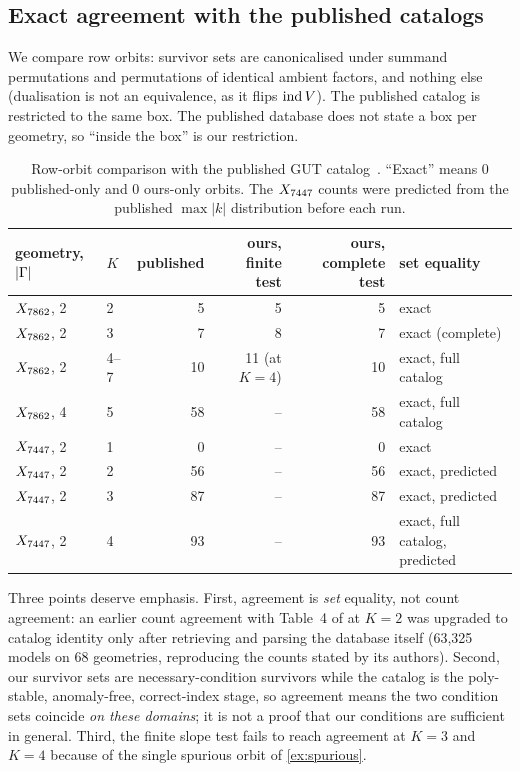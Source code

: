 \subsection{Exact agreement with the published catalogs}

We compare row orbits: survivor sets are canonicalised under summand
permutations and permutations of identical ambient factors, and nothing else
(dualisation is not an equivalence, as it flips $\operatorname{ind} V$). The published catalog
is restricted to the same box. The published database does not state a box per
geometry, so ``inside the box'' is our restriction.

\begin{table}[h]
\centering\footnotesize
\setlength{\tabcolsep}{4pt}
\begin{tabular}{@{}llrrrl@{}}
\toprule
geometry, $|\Gamma|$ & $K$ & published & ours, finite test & ours, complete test & set equality \\
\midrule
$X_{7862}$, 2 & 2 & 5 & 5 & 5 & exact \\
$X_{7862}$, 2 & 3 & 7 & 8 & 7 & exact (complete) \\
$X_{7862}$, 2 & 4--7 & 10 & 11 (at $K=4$) & 10 & exact, full catalog \\
$X_{7862}$, 4 & 5 & 58 & -- & 58 & exact, full catalog \\
$X_{7447}$, 2 & 1 & 0 & -- & 0 & exact \\
$X_{7447}$, 2 & 2 & 56 & -- & 56 & exact, predicted \\
$X_{7447}$, 2 & 3 & 87 & -- & 87 & exact, predicted \\
$X_{7447}$, 2 & 4 & 93 & -- & 93 & exact, full catalog, predicted \\
\bottomrule
\end{tabular}
\caption{Row-orbit comparison with the published GUT catalog~\cite{ACGLP2013,OxfordCICY}.
``Exact'' means 0 published-only and 0 ours-only orbits. The $X_{7447}$ counts were
predicted from the published $\max|k|$ distribution before each run.}
\label{tab:catalog}
\end{table}

Three points deserve emphasis. First, agreement is \emph{set} equality, not
count agreement: an earlier count agreement with Table~4 of \cite{ACGLP2013} at
$K=2$ was upgraded to catalog identity only after retrieving and parsing the
database itself (63,325 models on 68 geometries, reproducing the counts stated
by its authors). Second, our survivor sets are necessary-condition survivors
while the catalog is the poly-stable, anomaly-free, correct-index stage, so
agreement means the two condition sets coincide \emph{on these domains}; it is
not a proof that our conditions are sufficient in general. Third, the finite
slope test fails to reach agreement at $K=3$ and $K=4$ because of the single
spurious orbit of \cref{ex:spurious}.


